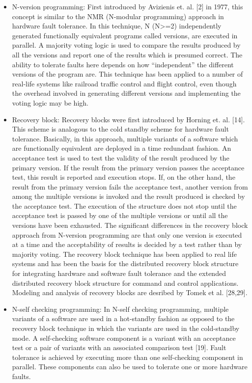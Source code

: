 \documentclass[oneside, a4paper, 11pt]{memoir}
\begin{document}
\begin{itemize}
\item N-version programming: First introduced by Avizienis et. al. [2] in 1977, this concept is similar to the NMR (N-modular programming) approach in hardware fault tolerance. In this technique, N (N>=2) independently generated functionally equivalent programs called versions, are executed in parallel. A majority voting logic is used to compare the results produced by all the versions and report one of the results which is presumed correct. The ability to tolerate faults here depends on how ``independent'' the different versions of the program are. This technique has been applied to a number of real-life systems like railroad traffic control and flight control, even though the overhead involved in generating different versions and implementing the voting logic may be high.
\item Recovery block: Recovery blocks were first introduced by Horning et. al. [14]. This scheme is analogous to the cold standby scheme for hardware fault tolerance. Basically, in this approach, multiple variants of a software which are functionally equivalent are deployed in a time redundant fashion. An acceptance test is used to test the validity of the result produced by the primary version. If the result from the primary version passes the acceptance test, this result is reported and execution stops. If, on the other hand, the result from the primary version fails the acceptance test, another version from among the multiple versions is invoked and the result produced is checked by the acceptance test. The execution of the structure does not stop until the acceptance test is passed by one of the multiple versions or until all the versions have been exhausted. The significant differences in the recovery block approach from N-version programming are that only one version is executed at a time and the acceptability of results is decided by a test rather than by majority voting. The recovery block technique has been applied to real life systems and has been the basis for the distributed recovery block structure for integrating hardware and software fault tolerance and the extended distributed recovery block structure for command and control applications. Modeling and analysis of recovery blocks are desribed by Tomek et al. [28,29].
\item N-self checking programming: In N-self checking programming, multiple variants of a software are used in a hot-standby fashion as opposed to the recovery block technique in which the variants are used in the cold-standby mode. A self-checking software component is a variant with an acceptance test or a pair of variants with an associated comparison test [19]. Fault tolerance is achieved by executing more than one self-checking component in parallel. These components can also be used to tolerate one or more hardware faults.
\end{itemize}
\end{document}
